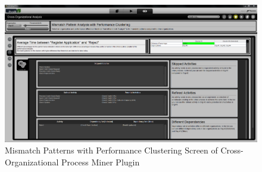 \begin{figure}
	\centering
	\includegraphics[width=\textwidth]{4_methodology/result-with-clustering-screen}
	\caption{ Mismatch Patterns with Performance Clustering Screen of Cross-Organizational Process Miner Plugin}
  \label{fig:result-with-clustering-screen}
\end{figure}